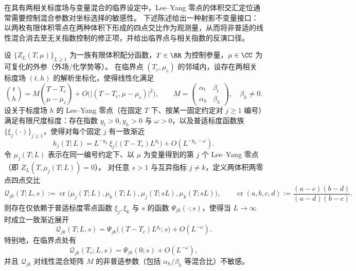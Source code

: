在具有两相关标度场与变量混合的临界设定中，Lee--Yang 零点的体积交汇定位通常需要控制混合参数对坐标选择的敏感性。
下述陈述给出一种射影不变量接口：以两枚有限体积零点在两种体积下形成的四点交比作为观测量，从而将非普适的线性混合消去至无关指数控制的修正项，并给出临界点与相关指数的反演口径。

\begin{theorem}[两体积两零点交比的不变性与临界定位]\label{thm:xi-leyang-two-scale-crossratio-invariant}
设 \(\{Z_L(T,\mu)\}_{L\ge 1}\) 为一族有限体积配分函数，\(T\in\RR\) 为控制参量，\(\mu\in\CC\) 为可复化的外参（外场/化学势等）。
在临界点 \((T_c,\mu_c)\) 的邻域内，设存在两相关标度场 \((t,h)\) 的解析坐标化，使得线性化满足
\begin{equation}\label{eq:xi-leyang-mixing-linearization}
\binom{t}{h}
=
M\binom{T-T_c}{\mu-\mu_c}
+O\!\bigl(\lvert(T-T_c,\mu-\mu_c)\rvert^2\bigr),
\qquad
M=\begin{pmatrix}\alpha_t&\beta_t\\ \alpha_h&\beta_h\end{pmatrix},
\quad \beta_h\neq 0.
\end{equation}
设关于标度场 \(h\) 的 Lee--Yang 零点（在固定 \(T\) 下、按某一固定约定对 \(j\ge 1\) 编号）满足有限尺度标度：存在指数 \(y_t>0,y_h>0\) 与 \(\omega>0\)，以及普适标度函数族 \(\{\xi_j(\cdot)\}_{j\ge 1}\)，使得对每个固定 \(j\) 有一致渐近
\begin{equation}\label{eq:xi-leyang-hzero-fss}
h_j(T;L)=L^{-y_h}\,\xi_j\!\bigl((T-T_c)L^{y_t}\bigr)+O(L^{-y_h-\omega}).
\end{equation}
令 \(\mu_j(T;L)\) 表示在同一编号约定下、以 \(\mu\) 为变量得到的第 \(j\) 个 Lee--Yang 零点（即 \(Z_L(T,\mu_j(T;L))=0\)）。
对任意 \(s>1\) 与互异指标 \(j\neq k\)，定义两体积两零点四点交比
\begin{equation}\label{eq:xi-leyang-two-scale-crossratio-def}
\mathcal Q_{jk}(T;L,s)
:=
\operatorname{cr}\bigl(\mu_j(T;L),\mu_k(T;L),\mu_j(T;sL),\mu_k(T;sL)\bigr),
\qquad
\operatorname{cr}(a,b,c,d):=\frac{(a-c)(b-d)}{(a-d)(b-c)}.
\end{equation}
则存在仅依赖于普适标度零点函数 \(\xi_j,\xi_k\) 与 \(s\) 的函数 \(\Psi_{jk}(\cdot;s)\)，使得当 \(L\to\infty\) 时成立一致渐近展开
\begin{equation}\label{eq:xi-leyang-two-scale-crossratio-scaling}
\mathcal Q_{jk}(T;L,s)=\Psi_{jk}\!\bigl((T-T_c)L^{y_t};s\bigr)+O(L^{-\omega}).
\end{equation}
特别地，在临界点处有
\begin{equation}\label{eq:xi-leyang-two-scale-crossratio-critical}
\mathcal Q_{jk}(T_c;L,s)=\Psi_{jk}(0;s)+O(L^{-\omega}),
\end{equation}
并且 \(\mathcal Q_{jk}\) 对线性混合矩阵 \(M\) 的非普适参数（包括 \(\alpha_h/\beta_h\) 等混合比）不敏感。
\end{theorem}
